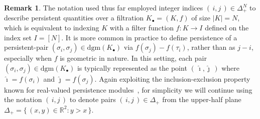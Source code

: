 \documentclass[10pt]{article}
\numberwithin{equation}{section}
\newcommand{\+}{%
	\raisebox{0.18ex}{\scaleobj{0.55}{+}}
}
\theoremstyle{definition}
\newtheorem{remark}{Remark}
\theoremstyle{definition}
\begin{document}
\begin{remark}
The notation used thus far employed integer indices $(\,i, j\,) \in \Delta_+^N$ to describe persistent quantities over a filtration $K_\bullet = (K, f)$ of size $\lvert K \rvert = N$, which is equivalent to indexing $K$ with a filter function $f : K \to I$ defined on the index set $I = [N]$.
It is more common in practice to define persistence of a persistent-pair $(\sigma_i, \sigma_j) \in \mathrm{dgm}(K_\bullet)$ via $f(\sigma_j) - f(\tau_i)$, rather than as $j - i$, especially when $f$ is  geometric in nature.
In this setting, each pair $(\sigma_i, \sigma_j) \in \mathrm{dgm}(K_\bullet)$ is typically represented as the point $(\, \hat\imath, \hat\jmath \, )$ where $\hat\imath = f(\sigma_i)$ and $\hat\jmath = f(\sigma_j)$.
Again exploiting the inclusion-exclusion property known for real-valued persistence modules~\cite{chazal2016structure}, for simplicity we will continue using the notation $(\,i, j\,)$ to denote pairs $(\,i, j\,) \in \Delta_{+}$ from the upper-half plane $\Delta_{+} = \{ \, (x,y) \in \mathbb{R}^2 : y > x \, \} $.

\end{remark}

\end{document}

